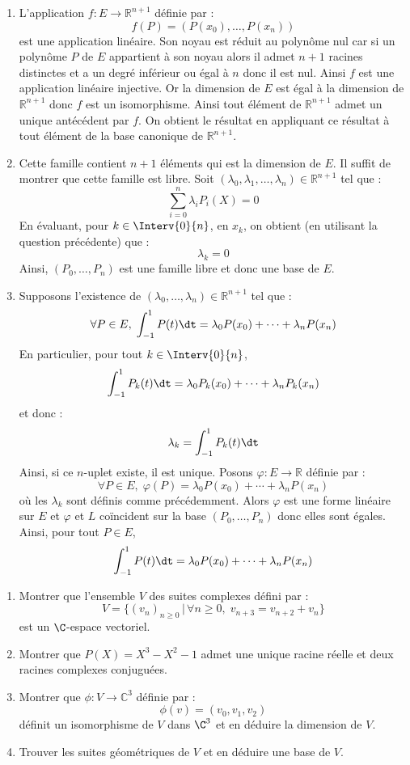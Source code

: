 \documentclass[a4paper,10pt]{report}
\begin{document}
\begin{enumerate}
\item L'application $f : E \rightarrow \mathbb{R}^{n+1}$ définie par :
$$ f(P) = (P(x_0), \ldots, P(x_n))$$
est une application linéaire. Son noyau est réduit au polynôme nul car si un polynôme $P$ de $E$ appartient à son noyau alors il admet $n+1$ racines distinctes et a un degré inférieur ou égal à $n$ donc il est nul. Ainsi $f$ est une application linéaire injective. Or la dimension de $E$ est égal à la dimension de $\mathbb{R}^{n+1}$ donc $f$ est un isomorphisme. Ainsi tout élément de $\mathbb{R}^{n+1}$ admet un unique antécédent par $f$. On obtient le résultat en appliquant ce résultat à tout élément de la base canonique de $\mathbb{R}^{n+1}$.
\item Cette famille contient $n+1$ éléments qui est la dimension de $E$. Il suffit de montrer que cette famille est libre. Soit $(\lambda_0, \lambda_1, \ldots, \lambda_n) \in \mathbb{R}^{n+1}$ tel que :
$$ \sum_{i=0}^n \lambda_i P_i (X)= 0$$
En évaluant, pour $k \in \Interv{0}{n}$, en $x_k$, on obtient (en utilisant la question précédente) que :
$$ \lambda_k =0$$
Ainsi, $(P_0, \ldots, P_n)$ est une famille libre et donc une base de $E$.
\item Supposons l'existence de $(\lambda_0, \ldots, \lambda_n) \in \mathbb{R}^{n+1}$ tel que :
$$ \forall P \in E, \; \int_{-1}^1 P(t) \dt = \lambda_0 P(x_0) + \cdots + \lambda_n P(x_n)$$
En particulier, pour tout $k \in \Interv{0}{n}$,
$$ \int_{-1}^1 P_k(t) \dt = \lambda_0 P_k(x_0) + \cdots + \lambda_n P_k(x_n)$$
et donc :
$$ \lambda_k =  \int_{-1}^1 P_k(t) \dt$$
Ainsi, si ce $n$-uplet existe, il est unique. Posons $\varphi : E \rightarrow \mathbb{R}$ définie par :
$$  \forall P \in E, \;  \varphi(P)= \lambda_0 P(x_0) + \cdots + \lambda_n P(x_n)$$
où les $\lambda_k$ sont définis comme précédemment. Alors $\varphi$ est une forme linéaire sur $E$ et $\varphi$ et $L$ coïncident sur la base $(P_0, \ldots, P_n)$ donc elles sont égales. Ainsi, pour tout $P \in E$,
$$ \int_{-1}^1 P(t) \dt = \lambda_0 P(x_0) + \cdots + \lambda_n P(x_n)$$
\end{enumerate}

\begin{Exercice}{} \begin{enumerate}
 \item Montrer que l'ensemble $V$ des suites complexes défini par :
 $$ V = \lbrace (v_n)_{n \geq 0} \, \vert \, \forall n \geq 0, \; v_{n+3}=v_{n+2}+v_n \rbrace$$
est un $\C$-espace vectoriel.
 \item Montrer que $P(X)=X^3-X^2-1$ admet une unique racine réelle et deux racines complexes conjuguées.
 \item Montrer que $\phi : V \rightarrow \mathbb{C}^3$ définie par :
 $$ \phi(v)=(v_0,v_1,v_2)$$
  définit un isomorphisme de $V$ dans $\C^3$ et en déduire la dimension de $V$.
 \item Trouver les suites géométriques de $V$ et en déduire une base de $V$.
\end{enumerate}
\end{Exercice}
\end{document}
